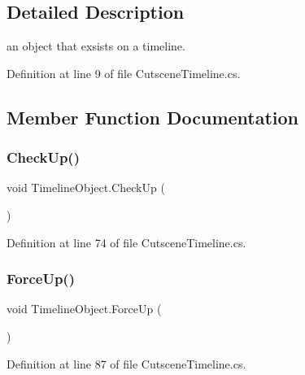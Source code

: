 \subsection{Detailed Description}
an object that exsists on a timeline. 



Definition at line 9 of file Cutscene\+Timeline.\+cs.



\subsection{Member Function Documentation}
\mbox{\label{class_timeline_object_acb9f150666346f219069ff74dcb65bde}} 
\subsubsection{\texorpdfstring{Check\+Up()}{CheckUp()}}
{\footnotesize\ttfamily void Timeline\+Object.\+Check\+Up (\begin{DoxyParamCaption}{ }\end{DoxyParamCaption})}



Definition at line 74 of file Cutscene\+Timeline.\+cs.

\mbox{\label{class_timeline_object_a9ca00ac2dd3e0e5a5bbefb9c04623c49}} 
\subsubsection{\texorpdfstring{Force\+Up()}{ForceUp()}}
{\footnotesize\ttfamily void Timeline\+Object.\+Force\+Up (\begin{DoxyParamCaption}{ }\end{DoxyParamCaption})}



Definition at line 87 of file Cutscene\+Timeline.\+cs.

\mbox{\label{class_timeline_object_a189eeb9fdfdd4eed9ce48c7424243077}} 

